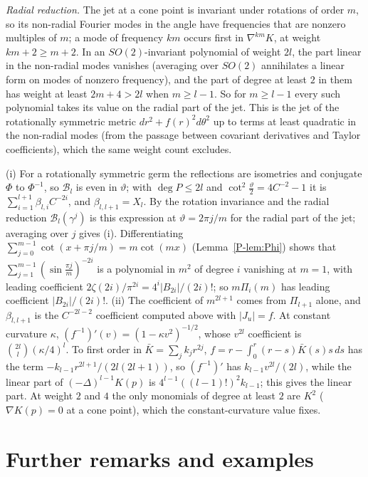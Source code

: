 \documentclass[pdflatex,sn-mathphys-num]{sn-jnl}
\newcommand{\pref}[1]{\ref*{P-#1}}%
\theoremstyle{thmstyleone}%
\theoremstyle{thmstylethree}%
\begin{document}
\emph{Radial reduction.} The jet at a cone point is invariant under rotations of order $m$, so its non-radial Fourier modes in the angle have frequencies that are nonzero multiples of $m$; a mode of frequency $km$ occurs first in $\nabla^{km}K$, at weight $km+2\ge m+2$. In an $SO(2)$-invariant polynomial of weight $2l$, the part linear in the non-radial modes vanishes (averaging over $SO(2)$ annihilates a linear form on modes of nonzero frequency), and the part of degree at least $2$ in them has weight at least $2m+4>2l$ when $m\ge l-1$. So for $m\ge l-1$ every such polynomial takes its value on the radial part of the jet. This is the jet of the rotationally symmetric metric $dr^2+f(r)^2d\theta^2$ up to terms at least quadratic in the non-radial modes (from the passage between covariant derivatives and Taylor coefficients), which the same weight count excludes.

(i) For a rotationally symmetric germ the reflections are isometries and conjugate $\Phi$ to $\Phi^{-1}$, so $\mathcal B_l$ is even in $\vartheta$; with $\deg P\le2l$ and $\cot^2\frac\vartheta2=4C^{-2}-1$ it is $\sum_{i=1}^{l+1}\beta_{l,i}C^{-2i}$, and $\beta_{l,l+1}=X_l$. By the rotation invariance and the radial reduction $\mathcal B_l(\gamma^j)$ is this expression at $\vartheta=2\pi j/m$ for the radial part of the jet; averaging over $j$ gives (i). Differentiating $\sum_{j=0}^{m-1}\cot(x+\pi j/m)=m\cot(mx)$ (Lemma~\pref{lem:Phi}) shows that $\sum_{j=1}^{m-1}(\sin\frac{\pi j}m)^{-2i}$ is a polynomial in $m^2$ of degree $i$ vanishing at $m=1$, with leading coefficient $2\zeta(2i)/\pi^{2i}=4^i|B_{2i}|/(2i)!$; so $m\Pi_i(m)$ has leading coefficient $|B_{2i}|/(2i)!$. (ii) The coefficient of $m^{2l+1}$ comes from $\Pi_{l+1}$ alone, and $\beta_{l,l+1}$ is the $C^{-2l-2}$ coefficient computed above with $|J_u|=f$. At constant curvature $\kappa$, $(f^{-1})'(v)=(1-\kappa v^2)^{-1/2}$, whose $v^{2l}$ coefficient is $\binom{2l}l(\kappa/4)^l$. To first order in $\bar K=\sum_jk_jr^{2j}$, $f=r-\int_0^r(r-s)\bar K(s)s\,ds$ has the term $-k_{l-1}r^{2l+1}/(2l(2l+1))$, so $(f^{-1})'$ has $k_{l-1}v^{2l}/(2l)$, while the linear part of $(-\Delta)^{l-1}K(p)$ is $4^{l-1}((l-1)!)^2k_{l-1}$; this gives the linear part. At weight $2$ and $4$ the only monomials of degree at least $2$ are $K^2$ ($\nabla K(p)=0$ at a cone point), which the constant-curvature value fixes.

\section{Further remarks and examples}\label{sec:remarks}
\end{document}

